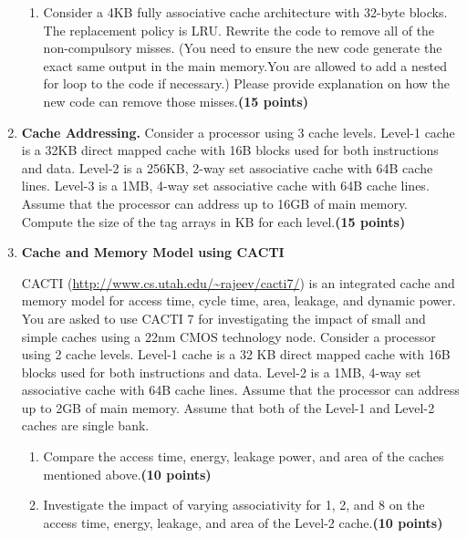\documentclass[a4paper, 11pt]{exam}
\begin{document}
\begin{enumerate}
\begin{enumerate}
\item Consider a 4KB fully associative cache architecture with 32-byte blocks. The replacement policy is LRU. Rewrite the code to remove  all of the non-compulsory misses. (You need to ensure the new code generate the exact same output in the main memory.You are allowed to add a nested for loop to the code if necessary.) Please provide explanation on how the new code can remove those misses.\textbf{(15 points)}


\end{enumerate}



\item \textbf {Cache Addressing.} Consider a processor using 3 cache levels. Level-1 cache is a
32KB direct mapped cache with 16B blocks used for both instructions and data. Level-2 is a
256KB, 2-way set associative cache with 64B cache lines. Level-3 is a
1MB, 4-way set associative cache with 64B cache lines. Assume that the processor can
address up to 16GB of main memory.  Compute the size of the tag arrays in KB for each level.\textbf{(15 points)}





\item \textbf{Cache and Memory Model using CACTI }

CACTI (\url{http://www.cs.utah.edu/~rajeev/cacti7/}) is an integrated cache and memory model for access time, cycle time, area, leakage, and dynamic power. You are asked to use CACTI 7 for investigating the impact of small and simple caches using a 22nm CMOS technology node. Consider a processor using 2 cache levels. Level-1 cache is a 32 KB direct mapped cache with 16B blocks used for both instructions and data. Level-2 is a 1MB, 4-way set associative cache with 64B cache lines. Assume that the processor can address up to 2GB of main memory. Assume that both of the Level-1 and Level-2 caches are single bank.
\begin{enumerate}
	\item Compare the access time, energy, leakage power, and area of the caches mentioned above.\textbf{(10 points)} 
    \item Investigate the impact of varying associativity for 1, 2, and 8 on the access time, energy, leakage, and area of the Level-2 cache.\textbf{(10 points)}

\end{enumerate}

\end{enumerate}
\end{document}
